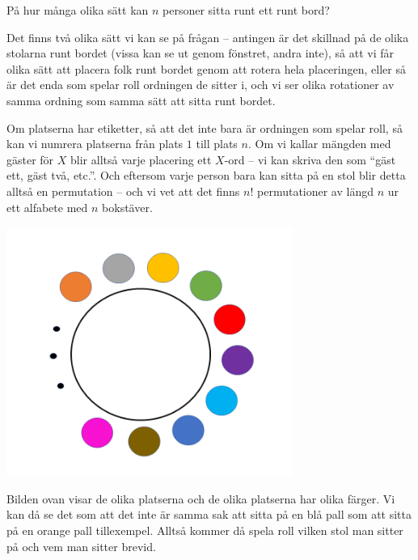 \documentclass{tufte-handout}
\begin{document}
\begin{example}
	På hur många olika sätt kan $n$ personer sitta runt ett runt bord?

	Det finns två olika sätt vi kan se på frågan -- antingen är det skillnad på de olika stolarna runt bordet (vissa kan se ut genom fönstret, andra inte), så att vi får olika sätt att placera folk runt bordet genom att rotera hela placeringen, eller så är det enda som spelar roll ordningen de sitter i, och vi ser olika rotationer av samma ordning som samma sätt att sitta runt bordet.

	Om platserna har etiketter, så att det inte bara är ordningen som spelar roll, så kan vi numrera platserna från plats $1$ till plats $n$. Om vi kallar mängden med gäster för $X$ blir alltså varje placering ett $X$-ord -- vi kan skriva den som ``gäst ett, gäst två, etc.''. Och eftersom varje person bara kan sitta på en stol blir detta alltså en permutation -- och vi vet att det finns $n!$ permutationer av längd $n$ ur ett alfabete med $n$ bokstäver.
 
\begin{center}
    \includegraphics[width=0.7\textwidth]{graphics/bordmedfarg1.png}
\end{center}


        Bilden ovan visar de olika platserna och de olika platserna har olika färger. Vi kan då se det som att det inte är samma sak att sitta på en blå pall som att sitta på en orange pall tillexempel. Alltså kommer då spela roll vilken stol man sitter på och vem man sitter brevid. 


\end{example}
\end{document}
